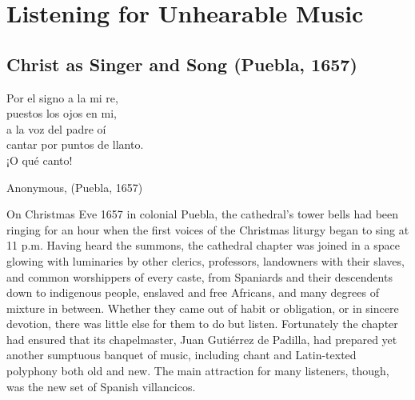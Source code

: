 
% 
% 


\part{Listening for Unhearable Music}
\label{part:unhearable-music}

\chapter{Christ as Singer and Song (Puebla, 1657)}
\label{ch:padilla-voces}

\epigraph
{Por el signo a la mi re, \\ 
puestos los ojos en mi, \\
a la voz del padre oí \\
cantar por puntos de llanto. \\
¡O qué canto!}
{Anonymous,  (Puebla, 1657)}

On Christmas Eve 1657 in colonial Puebla, the cathedral's tower bells had been
ringing for an hour when the first voices of the Christmas liturgy began to sing
at 11 p.m.
Having heard the summons, the cathedral chapter was joined in a space glowing
with luminaries by other clerics, professors, landowners with their slaves, and
common worshippers of every caste, from Spaniards and their descendents down to
indigenous people, enslaved and free Africans, and many degrees of mixture in
between.
Whether they came out of habit or obligation, or in sincere devotion, there was
little else for them to do but listen.
Fortunately the chapter had ensured that its chapelmaster, Juan Gutiérrez de
Padilla, had prepared yet another sumptuous banquet of music, including chant
and Latin-texted polyphony both old and new.
The main attraction for many listeners, though, was the new set of Spanish
villancicos.

